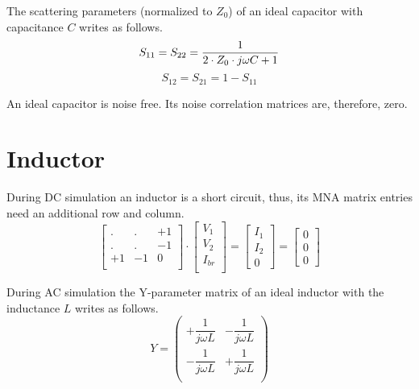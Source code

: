 The scattering parameters (normalized to $Z_0$) of an ideal capacitor
with capacitance $C$ writes as follows.
\begin{equation}
S_{11} = S_{22} = \frac{1}{2\cdot Z_0\cdot j\omega C+1} \\
\end{equation}
\begin{equation}
S_{12} = S_{21} = 1-S_{11}
\end{equation}

An ideal capacitor is noise free. Its noise correlation matrices
are, therefore, zero.


\section{Inductor}

During DC simulation an inductor is a short circuit, thus, its
MNA matrix entries need an additional row and column.
\begin{equation}
\begin{bmatrix}
. & . & +1\\
. & . & -1\\
+1 & -1 & 0\\
\end{bmatrix}
\cdot
\begin{bmatrix}
V_1\\
V_2\\
I_{br}\\
\end{bmatrix}
=
\begin{bmatrix}
I_1\\
I_2\\
0
\end{bmatrix}
=
\begin{bmatrix}
0\\
0\\
0
\end{bmatrix}
\end{equation}

During AC simulation the Y-parameter matrix of an ideal inductor
with the inductance $L$ writes as follows.
\begin{equation}
Y =
\begin{pmatrix}
+\dfrac{1}{j\omega L} & -\dfrac{1}{j\omega L}\\
-\dfrac{1}{j\omega L} & +\dfrac{1}{j\omega L}\\
\end{pmatrix}
\end{equation}

